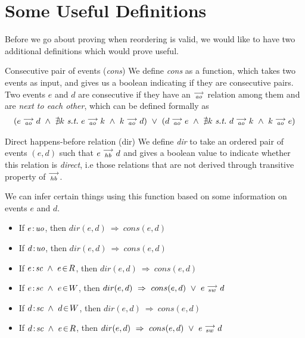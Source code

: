 \section{Some Useful Definitions}
Before we go about proving when reordering is valid, we would like to have two additional definitions which would prove useful\footnotemark.


\begin{definition}{Consecutive pair of events (\emph{cons})}
    \label{Cons}
    We define \emph{cons} as a function, which takes two events as input, and gives us a boolean indicating if they are consecutive pairs. Two events $e$ and $d$ are consecutive if they have an $\stackrel{\longrightarrow}{_\textit{ao}}$ relation among them and are \emph{next to each other}, which can be defined formally as 
        \begin{align*}
            (
            e \stck{_\textit{ao}} d  \ \wedge \ 
            \nexists k \ \textit{s.t.} \ 
            e \stck{_\textit{ao}} k  \ \wedge \
            k \stck{_\textit{ao}} d 
            )
            \ \vee \
            (
                d \stck{_\textit{ao}} e  \ \wedge \ 
                \nexists k \ \textit{s.t.} \ 
                d \stck{_\textit{ao}} k  \ \wedge \
                k \stck{_\textit{ao}} e  
            )
        \end{align*}
\end{definition}

\begin{definition}{Direct happens-before relation (dir)}
    \label{Dir}
    We define \emph{dir} to take an ordered pair of events $(e,d)$ such that $e\stackrel{\longrightarrow}{_{hb}}d$ and gives a boolean value to indicate whether this relation is \textit{direct}, i.e those relations that are not derived through transitive property of $\stackrel{\longrightarrow}{_\textit{hb}}$.
    
    We can infer certain things using this function based on some information on events $e$ and $d$. 
    \begin{itemize}
        \item If $e\!:\!\textit{uo}$, then $dir(e,d) \ \Rightarrow \ cons(e,d)$
        \item If $d\!:\!\textit{uo}$, then $dir(e,d) \ \Rightarrow \ cons(e,d)$
        \item If $\et{e}{sc}\ \wedge\ e\!\in\!R$, then $dir(e,d) \ \Rightarrow \ cons(e,d)$
        \item If $\et{e}{sc}\ \wedge\ e\!\in\!W$, then $dir(e,d) \ \Rightarrow \ cons(e,d)\ \vee\ \reln{e}{sw}{d}$
        \item If $\et{d}{sc}\ \wedge\ d\!\in\!W$, then $dir(e,d) \ \Rightarrow \ cons(e,d)$
        \item If $\et{d}{sc}\ \wedge\ e\!\in\!R$, then $dir(e,d) \ \Rightarrow \ cons(e,d)\ \vee\ \reln{e}{sw}{d}$
    \end{itemize}
\end{definition}


